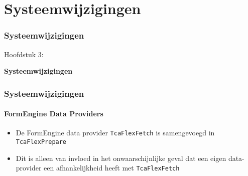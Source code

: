%

\section{Systeemwijzigingen}
\begin{frame}[fragile]
	\frametitle{Systeemwijzigingen}

	\begin{center}\huge{Hoofdstuk 3:}\end{center}
	\begin{center}\huge{\color{typo3darkgrey}\textbf{Systeemwijzigingen}}\end{center}

\end{frame}


\begin{frame}[fragile]
	\frametitle{Systeemwijzigingen}
	\framesubtitle{FormEngine Data Providers}

	\begin{itemize}
		\item De FormEngine data provider \texttt{TcaFlexFetch} is samengevoegd in \texttt{TcaFlexPrepare}
		\item Dit is alleen van invloed in het onwaarschijnlijke geval dat een eigen data-provider een afhankelijkheid heeft
			met \texttt{TcaFlexFetch}
	\end{itemize}

\end{frame}

